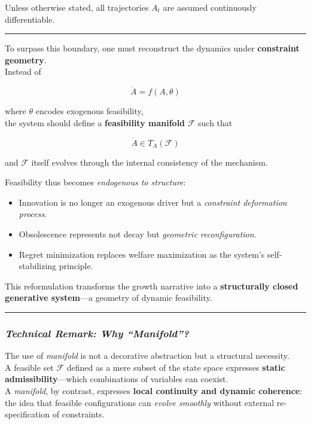 \documentclass[11pt]{article}
\begin{document}
Unless otherwise stated, all trajectories \(A_t\) are assumed
continuously differentiable.

\begin{center}\rule{0.5\linewidth}{0.5pt}\end{center}

To surpass this boundary, one must reconstruct the dynamics under
\textbf{constraint geometry}.\\
Instead of

\[
\dot{A} = f(A, \theta)
\]

where \(\theta\) encodes exogenous feasibility,\\
the system should define a \textbf{feasibility manifold} \(\mathcal{F}\)
such that

\[
\dot{A} \in T_A(\mathcal{F})
\]

and \(\mathcal{F}\) itself evolves through the internal consistency of
the mechanism.

Feasibility thus becomes \emph{endogenous to structure}:

\begin{itemize}
\tightlist
\item
  Innovation is no longer an exogenous driver but a \emph{constraint
  deformation process}.\\
\item
  Obsolescence represents not decay but \emph{geometric
  reconfiguration}.\\
\item
  Regret minimization replaces welfare maximization as the system's
  self-stabilizing principle.
\end{itemize}

This reformulation transforms the growth narrative into a
\textbf{structurally closed generative system}---a geometry of dynamic
feasibility.

\begin{center}\rule{0.5\linewidth}{0.5pt}\end{center}

\subsubsection{\texorpdfstring{\emph{Technical Remark: Why
``Manifold''?}}{Technical Remark: Why ``Manifold''?}}\label{technical-remark-why-manifold}

The use of \emph{manifold} is not a decorative abstraction but a
structural necessity.\\
A feasible set \(\mathcal{F}\) defined as a mere subset of the state
space expresses \textbf{static admissibility}---which combinations of
variables can coexist.\\
A \emph{manifold}, by contrast, expresses \textbf{local continuity and
dynamic coherence}: the idea that feasible configurations can
\emph{evolve smoothly} without external re-specification of constraints.
\end{document}
